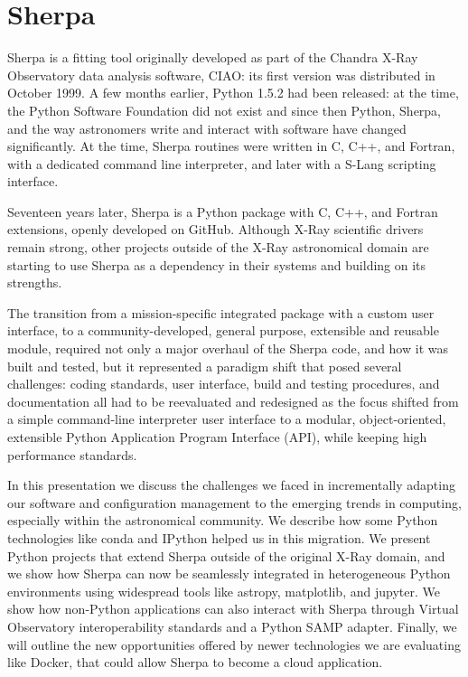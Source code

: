 \documentclass[11pt,twoside]{article}
\begin{document}
\section{Sherpa}
Sherpa \citep{sherpa} is a fitting tool originally developed as part of the Chandra X-Ray Observatory data analysis software, CIAO: its first version was distributed in October 1999. A few months earlier, Python 1.5.2 had been released: at the time, the Python Software Foundation did not exist and since then Python, Sherpa, and the way astronomers write and interact with software have changed significantly. At the time, Sherpa routines were written in C, C++, and Fortran, with a dedicated command line interpreter, and later with a S-Lang scripting interface.

Seventeen years later, Sherpa is a Python package with C, C++, and Fortran extensions, openly developed on GitHub. Although X-Ray scientific drivers remain strong, other projects outside of the X-Ray astronomical domain are starting to use Sherpa as a dependency in their systems and building on its strengths.

The transition from a mission-specific integrated package with a custom user interface, to a community-developed, general purpose, extensible and reusable module, required not only a major overhaul of the Sherpa code, and how it was built and tested, but it represented a paradigm shift that posed several challenges: coding standards, user interface, build and testing procedures, and documentation all had to be reevaluated and redesigned as the focus shifted from a simple command-line interpreter user interface to a modular, object-oriented, extensible Python Application Program Interface (API), while keeping high performance standards.

In this presentation we discuss the challenges we faced in incrementally adapting our software and configuration management to the emerging trends in computing, especially within the astronomical community. We describe how some Python technologies like conda and IPython helped us in this migration. We present Python projects that extend Sherpa outside of the original X-Ray domain, and we show how Sherpa can now be seamlessly integrated in heterogeneous Python environments using widespread tools like astropy, matplotlib, and jupyter. We show how non-Python applications can also interact with Sherpa through Virtual Observatory interoperability standards and a Python SAMP adapter. Finally, we will outline the new opportunities offered by newer technologies we are evaluating like Docker, that could allow Sherpa to become a cloud application.
\end{document}
